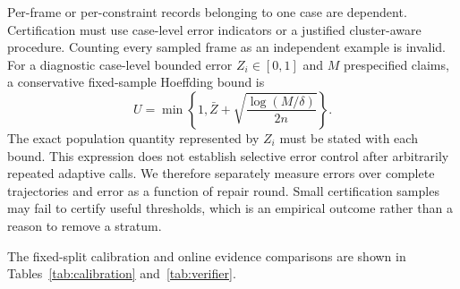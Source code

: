 Per-frame or per-constraint records belonging to one case are dependent.
Certification must use case-level error indicators or a justified cluster-aware
procedure. Counting every sampled frame as an independent example is invalid.
For a diagnostic case-level bounded error $Z_i\in[0,1]$ and $M$ prespecified
claims, a conservative fixed-sample Hoeffding bound is
\begin{equation}
U=\min\!\left\{1,\bar Z+
\sqrt{\frac{\log(M/\delta)}{2n}}\right\}.
\end{equation}
The exact population quantity represented by $Z_i$ must be stated with each
bound. This expression does not establish selective error control after
arbitrarily repeated adaptive calls. We therefore separately measure errors
over complete trajectories and error as a function of repair round.
Small certification samples may fail to certify useful thresholds, which is
an empirical outcome rather than a reason to remove a stratum.

The fixed-split calibration and online evidence comparisons are shown in
Tables~\ref{tab:calibration} and~\ref{tab:verifier}.

